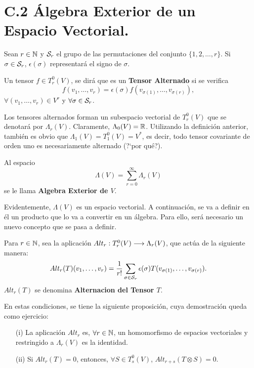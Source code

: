 \documentclass[cursovd_portada.tex]{subfiles}
\begin{document}
\section*{C.2 \'{A}lgebra Exterior de un Espacio Vectorial.}
 \hs Sean $r\in\mathbb{N}$ y
${\cal S}_r$ el grupo de las permutaciones del conjunto $\{1,2,\dots ,r\}$. Si $\sigma\in{\cal S}_r$,
$\epsilon(\sigma)$ representar\'{a} el signo de $\sigma$.
\begin{defiap}
Un tensor $f\in T^0_r(V)$, se dir\'{a} que es un {\bf Tensor Alternado} si se verifica
$$f(v_1,\dots ,v_r)=\epsilon(\sigma)f(v_{\sigma (1)},\dots ,v_{\sigma (r)}),$$
$\forall (v_1,\dots ,v_r)\in V^r$ y $\forall\sigma\in{\cal S}_r$.
\end{defiap}
\par\bigskip
Los tensores alternados forman un subespacio vectorial de $T^0_r(V)$ que se denotar\'{a} por $\Lambda_r(V)$.
Claramente, $\Lambda _0(V)=\mathbb{R}$. Utilizando la definici\'{o}n anterior, tambi\'{e}n es obvio que $\Lambda
_1(V)=T^0_1(V)=V^*$, es decir, todo tensor covariante de orden uno es necesariamente alternado (?`por qu\'{e}?).
\begin{defiap}
Al espacio
$$\Lambda (V)=\sum_{r=0}^\infty\Lambda_r(V)$$
se le llama {\bf Algebra Exterior de $V$}.
\end{defiap}
\par\bigskip
Evidentemente, $\Lambda (V)$ es un espacio vectorial. A continuaci\'{o}n, se va a definir en \'{e}l un producto que lo va
a convertir en un \'{a}lgebra. Para ello, ser\'{a} necesario un nuevo concepto que se pasa a definir.
\begin{defiap}
Para $r\in\mathbb{N}$, sea la aplicaci\'{o}n $Alt_r:T^0_r(V)\longrightarrow\Lambda _r(V)$, que act\'{u}a de la siguiente manera:
$$Alt_r(T)(v_1,\dots ,v_r)=\frac{1}{r!}\sum_{\sigma\in{\cal S}_r}\epsilon(
\sigma)T(v_{\sigma(1)},\dots ,v_{\sigma(r)}).$$ \hs $Alt_r(T)$ se denomina {\bf Alternacion del Tensor $T$}.
\end{defiap}
\par\bigskip
En estas condiciones, se tiene la siguiente proposici\'{o}n, cuya demostraci\'{o}n queda como ejercicio:
\begin{propoap}
\begin{enumerate}
\item[(i)] La aplicaci\'{o}n $Alt_r$ es, $\forall r\in\mathbb{N}$, un homomorfismo de
espacios vectoriales y restringido a $\Lambda_r(V)$ es la identidad.
\item[(ii)] Si $Alt_r(T)=0$, entonces, $\forall S\in T^0_s(V)$, $Alt_{r+s}(T
\otimes S)=0$.
\end{enumerate}
\end{propoap}
\end{document}
